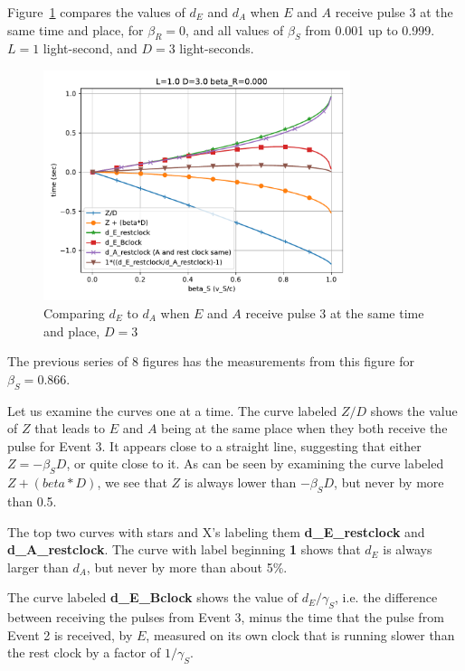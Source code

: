 \documentclass[a4paper]{article}
\theoremstyle{plain}
\theoremstyle{definition}
\begin{document}
Figure~\ref{fig:compare-d_E-to-d_A-D-3} compares the values of $d_E$ and
$d_A$ when $E$ and $A$ receive pulse 3 at the same time and place, for
$\beta_R = 0$, and all values of $\beta_S$ from 0.001 up to 0.999.
$L=1$ light-second, and $D=3$ light-seconds.
\begin{figure}[ht]
	\centering
	\includegraphics[width=0.8\textwidth]{scen2b-where-E-starts-to-receive-pulse-3-at-A-location-D-3.0-beta_R-0.000.pdf}
	\caption{Comparing $d_E$ to $d_A$ when $E$ and $A$ receive pulse 3 at the same time and place, $D=3$}
	\label{fig:compare-d_E-to-d_A-D-3}
\end{figure}
The previous series of 8 figures has the measurements from this figure
for $\beta_S=0.866$.

Let us examine the curves one at a time.  The curve labeled $Z/D$
shows the value of $Z$ that leads to $E$ and $A$ being at the same
place when they both receive the pulse for Event 3.  It appears close
to a straight line, suggesting that either $Z = -\beta_S D$, or quite
close to it.  As can be seen by examining the curve labeled
$Z+(beta*D)$, we see that $Z$ is always lower than $-\beta_SD$, but
never by more than 0.5.

The top two curves with stars and X's labeling them
\textbf{d\_E\_restclock} and \textbf{d\_A\_restclock}.  The curve with
label beginning \textbf{1} shows that $d_E$ is always larger than
$d_A$, but never by more than about 5\%.

The curve labeled \textbf{d\_E\_Bclock} shows the value of
$d_E / \gamma_S$, i.e. the difference between receiving the pulses
from Event 3, minus the time that the pulse from Event 2 is received,
by $E$, measured on its own clock that is running slower than the rest
clock by a factor of $1/\gamma_S$.
\end{document}
